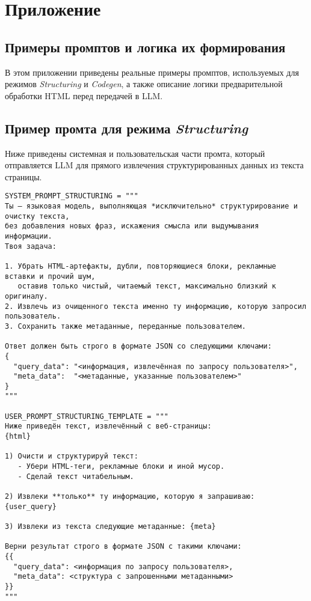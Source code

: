 
\appendix
\section{Приложение}

\subsection{Примеры промптов и логика их формирования}

В этом приложении приведены реальные примеры промптов, используемых для режимов \emph{Structuring} и \emph{Codegen}, а также описание логики предварительной обработки HTML перед передачей в LLM.

\subsection{Пример промта для режима \emph{Structuring}}

Ниже приведены системная и пользовательская части промта, который отправляется LLM для прямого извлечения структурированных данных из текста страницы.

\begin{verbatim}
SYSTEM_PROMPT_STRUCTURING = """
Ты — языковая модель, выполняющая *исключительно* структурирование и очистку текста,
без добавления новых фраз, искажения смысла или выдумывания информации.
Твоя задача:

1. Убрать HTML-артефакты, дубли, повторяющиеся блоки, рекламные вставки и прочий шум,
   оставив только чистый, читаемый текст, максимально близкий к оригиналу.
2. Извлечь из очищенного текста именно ту информацию, которую запросил пользователь.
3. Сохранить также метаданные, переданные пользователем.

Ответ должен быть строго в формате JSON со следующими ключами:
{
  "query_data": "<информация, извлечённая по запросу пользователя>",
  "meta_data":  "<метаданные, указанные пользователем>"
}
"""

USER_PROMPT_STRUCTURING_TEMPLATE = """
Ниже приведён текст, извлечённый с веб-страницы:
{html}

1) Очисти и структурируй текст:
   - Убери HTML-теги, рекламные блоки и иной мусор.
   - Сделай текст читабельным.

2) Извлеки **только** ту информацию, которую я запрашиваю: {user_query}

3) Извлеки из текста следующие метаданные: {meta}

Верни результат строго в формате JSON с такими ключами:
{{
  "query_data": <информация по запросу пользователя>,
  "meta_data": <структура с запрошенными метаданными>
}}
"""
\end{verbatim}


